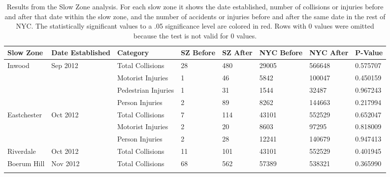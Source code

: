 \documentclass[10pt,journal,compsoc]{IEEEtran}
\begin{document}
\begin{table}[]
\centering
\caption{Results from the Slow Zone analysis.  For each slow zone it shows the date established, number of collisions or injuries before and after that date within the slow zone, and the number of accidents or injuries before and after the same date in the rest of NYC.  The statistically significant values to a .05 significance level are colored in red. Rows with 0 values were omitted because the test is not valid for 0 values.}
\label{tab:sz}
\begin{tabular}{|l|l|l|l|l|l|l|l|}
\hline
Slow Zone                                      & Date Established            & Category            & SZ Before & SZ After & NYC Before & NYC After & P-Value  \\ \hline
\multirow{4}{*}{Inwood}                        & \multirow{4}{*}{Sep 2012} & Total Collisions    & 28        & 480      & 29005      & 566648    & 0.575707 \\ \cline{3-8} 
                                               &                             & Motorist Injuries   & 1         & 46       & 5842       & 100047    & 0.450159 \\ \cline{3-8} 
                                               &                             & Pedestrian Injuries & 1         & 31       & 1544       & 32487     & 0.967243 \\ \cline{3-8} 
                                               &                             & Person Injuries     & 2         & 89       & 8262       & 144663    & 0.217994 \\ \hline
\multirow{3}{*}{Eastchester}                   & \multirow{3}{*}{Oct 2012} & Total Collisions    & 7         & 114      & 43101      & 552529    & 0.652047 \\ \cline{3-8} 
                                               &                             & Motorist Injuries   & 2         & 20       & 8603       & 97295     & 0.818009 \\ \cline{3-8} 
                                               &                             & Person Injuries     & 2         & 28       & 12241      & 140679    & 0.947413 \\ \hline
Riverdale                                      & Oct 2012                  & Total Collisions    & 11        & 101      & 43101      & 552529    & 0.401945 \\ \hline
\multirow{5}{*}{Boerum Hill}                   & \multirow{5}{*}{Nov 2012} & Total Collisions    & 68        & 562      & 57389      & 538321    & 0.365990 \\ \cline{3-8} 

\end{tabular}
\end{table}
\end{document}
